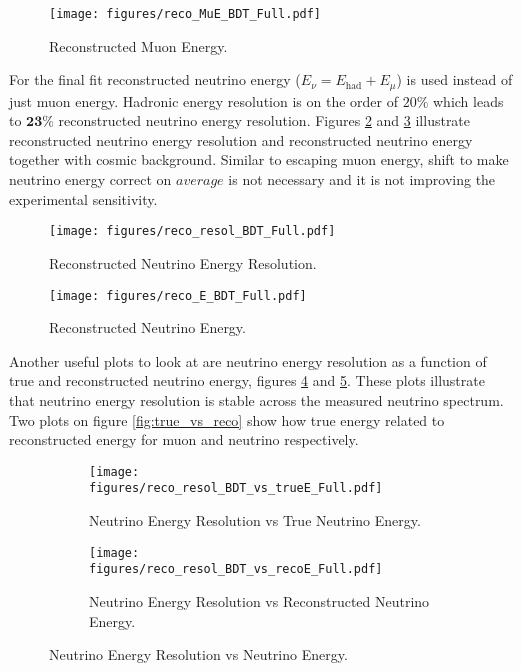 \begin{figure}[!th]
\centering
\texttt{[image: figures/reco\_MuE\_BDT\_Full.pdf]}
\caption{Reconstructed Muon Energy.}
\label{fig:recoMuE}
\end{figure}

For the final fit reconstructed neutrino energy ($E_\nu = E_{\text{had}} + E_\mu$) is used instead 
of just muon energy. Hadronic energy resolution is on the order of $20\%$ which leads to 
$\textbf{23\%}$ reconstructed neutrino energy resolution. Figures \ref{fig:recoE_resol} and 
\ref{fig:recoE} illustrate reconstructed neutrino energy resolution and reconstructed neutrino
energy together with cosmic background. Similar to escaping muon energy, shift to make neutrino
energy correct on $\textit{average}$ is not necessary and it is not improving the experimental sensitivity.
\begin{figure}[!th]
\centering
\texttt{[image: figures/reco\_resol\_BDT\_Full.pdf]}
\caption{Reconstructed Neutrino Energy Resolution.}
\label{fig:recoE_resol}
\end{figure}

\begin{figure}[!th]
\centering
\texttt{[image: figures/reco\_E\_BDT\_Full.pdf]}
\caption{Reconstructed Neutrino Energy.}
\label{fig:recoE}
\end{figure}

Another useful plots to look at are neutrino energy resolution as a function of true and reconstructed
neutrino energy, figures \ref{fig:resol_vs_trueE} and \ref{fig:resol_vs_recoE}. These plots illustrate that 
neutrino energy resolution is stable across the measured neutrino spectrum. Two plots on figure 
\ref{fig:true_vs_reco} show how true energy related to reconstructed energy for muon and neutrino respectively.
\begin{figure}[!th]
\centering
\begin{subfigure}[t]{0.95\textwidth}
  \centering
  \texttt{[image: figures/reco\_resol\_BDT\_vs\_trueE\_Full.pdf]}
  \caption{Neutrino Energy Resolution vs True Neutrino Energy.}
  \label{fig:resol_vs_trueE}
\end{subfigure}
\vspace{0.5cm}
\newline
\begin{subfigure}[t]{0.95\textwidth}
  \centering
  \texttt{[image: figures/reco\_resol\_BDT\_vs\_recoE\_Full.pdf]}
  \caption{Neutrino Energy Resolution vs Reconstructed Neutrino Energy.}
  \label{fig:resol_vs_recoE}
\end{subfigure}
\caption{ Neutrino Energy Resolution vs Neutrino Energy.}
\label{fig:resol_vs_E}
\end{figure}

